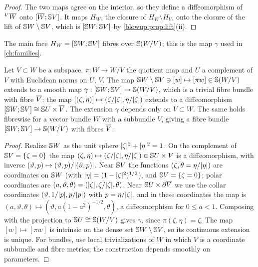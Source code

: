 \begin{proof}
The two maps agree on the interior, so they define a diffeomorphism of ${}^{V}\overline{W}$ onto
$[\overline{W};\mathbb{S} V]$. It maps $H_W$, the closure of $H_W\setminus H_V$, onto the closure of the
lift of $\mathbb{S} W\setminus\mathbb{S} V$, which is $[\mathbb{S} W;\mathbb{S} V]$ by
\cref{blowup:prop:lift}(ii).
\end{proof}

The main face $H_W=[\mathbb{S} W;\mathbb{S} V]$ fibres over $\mathbb{S}(W/V)$; this is the map
$\gamma$ used in \cref{ch:families}.

\begin{lemma}\label{blowup:lem:sphere-fibration}
Let $V\subset W$ be a subspace, $\pi:W\to W/V$ the quotient map and $U$ a complement of $V$
with Euclidean norms on $U$, $V$. The map $\mathbb{S} W\setminus\mathbb{S} V\ni[w]\mapsto[\pi w]\in\mathbb{S}(W/V)$
extends to a smooth map $\gamma:[\mathbb{S} W;\mathbb{S} V]\to\mathbb{S}(W/V)$, which is a trivial
fibre bundle with fibre $\overline{V}$: the map $[(\zeta,\eta)]\mapsto(\zeta/\lvert \zeta\rvert,\eta/\lvert \zeta\rvert)$
extends to a diffeomorphism $[\mathbb{S} W;\mathbb{S} V]\cong\mathbb{S} U\times\overline{V}$. The extension
$\gamma$ depends only on $V\subset W$. The same holds fibrewise for a vector bundle $W$
with a subbundle $V$, giving a fibre bundle $[\mathbb{S} W;\mathbb{S} V]\to\mathbb{S}(W/V)$ with
fibres $\overline{V}$.
\end{lemma}
\begin{proof}
Realize $\mathbb{S} W$ as the unit sphere $\lvert \zeta\rvert^2+\lvert \eta\rvert^2=1$. On the complement of
$\mathbb{S} V=\{\zeta=0\}$ the map $(\zeta,\eta)\mapsto(\zeta/\lvert \zeta\rvert,\eta/\lvert \zeta\rvert)\in\mathbb{S} U\times V$
is a diffeomorphism, with inverse $(\vartheta,p)\mapsto(\vartheta,p)/\lvert (\vartheta,p)\rvert$. Near
$\mathbb{S} V$ the functions $(\zeta,\theta=\eta/\lvert \eta\rvert)$ are coordinates on $\mathbb{S} W$ (with
$\lvert \eta\rvert=(1-\lvert \zeta\rvert^2)^{1/2}$), and $\mathbb{S} V=\{\zeta=0\}$; polar coordinates are
$(a,\vartheta,\theta)=(\lvert \zeta\rvert,\zeta/\lvert \zeta\rvert,\theta)$. Near $\mathbb{S} U\times\partial\overline{V}$ we use the
collar coordinates $(\vartheta,1/\lvert p\rvert,p/\lvert p\rvert)$ with $p=\eta/\lvert \zeta\rvert$, and in these
coordinates the map is $(a,\vartheta,\theta)\mapsto(\vartheta,a(1-a^2)^{-1/2},\theta)$, a
diffeomorphism for $0\le a<1$. Composing with the projection to $\mathbb{S} U\cong\mathbb{S}(W/V)$
gives $\gamma$, since $\pi(\zeta,\eta)=\zeta$. The map $[w]\mapsto[\pi w]$ is intrinsic on the
dense set $\mathbb{S} W\setminus\mathbb{S} V$, so its continuous extension is unique. For bundles, use
local trivializations of $W$ in which $V$ is a coordinate subbundle and fibre metrics; the
construction depends smoothly on parameters.
\end{proof}

